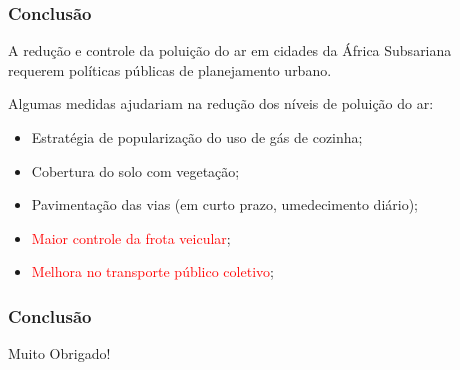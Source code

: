 \begin{frame}
  \frametitle{Conclusão}
     \begin{tcolorbox}[colback=blue!5,colframe=blue!40!black]
  A redução e controle da poluição do ar em cidades da África Subsariana requerem políticas públicas de planejamento urbano.
\end{tcolorbox}


	   Algumas medidas ajudariam na redução dos níveis de poluição do ar:

  \begin{itemize}
    \item Estratégia de popularização do uso de gás de cozinha;
    \item Cobertura do solo com vegetação;
    \item Pavimentação das vias (em curto prazo, umedecimento diário);
    \item \textcolor{red}{Maior controle da frota veicular};
    \item \textcolor{red}{Melhora no transporte público coletivo};
  \end{itemize}
\end{frame}



\begin{frame}
  \frametitle{Conclusão}
  \begin{center}
    Muito Obrigado!
  \end{center}
\end{frame}
